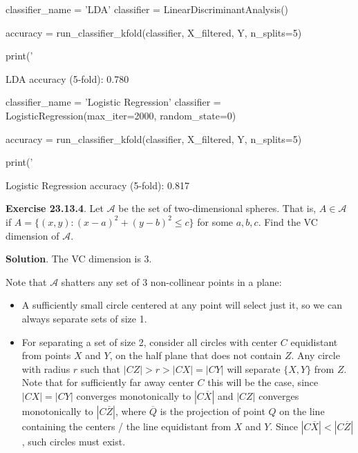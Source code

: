 \begin{python}
classifier_name = 'LDA'
classifier = LinearDiscriminantAnalysis()

accuracy = run_classifier_kfold(classifier, X_filtered, Y, n_splits=5)

print('%
\end{python}

\begin{console}
LDA accuracy (5-fold): 0.780
\end{console}

\begin{python}
classifier_name = 'Logistic Regression'
classifier = LogisticRegression(max_iter=2000, random_state=0)

accuracy = run_classifier_kfold(classifier, X_filtered, Y, n_splits=5)

print('%
\end{python}

\begin{console}
Logistic Regression accuracy (5-fold): 0.817
\end{console}

\textbf{Exercise 23.13.4}. Let \(\mathcal{A}\) be the set of
two-dimensional spheres. That is, \(A \in \mathcal{A}\) if
\(A = \{ (x, y) : (x - a)^2 + (y - b)^2 \leq c \}\) for some
\(a, b, c\). Find the VC dimension of \(\mathcal{A}\).

\textbf{Solution}. The VC dimension is 3.

Note that \(\mathcal{A}\) shatters any set of 3 non-collinear points in
a plane:

\begin{itemize}[tightlist]
\item
  A sufficiently small circle centered at any point will select just it,
  so we can always separate sets of size 1.
\item
  For separating a set of size 2, consider all circles with center \(C\)
  equidistant from points \(X\) and \(Y\), on the half plane that does
  not contain \(Z\). Any circle with radius \(r\) such that
  \(|CZ| > r > |CX| = |CY|\) will separate \(\{ X, Y \}\) from \(Z\).
  Note that for sufficiently far away center \(C\) this will be the
  case, since \(|CX| = |CY|\) converges monotonically to
  \(|C\overline{X}|\) and \(|CZ|\) converges monotonically to
  \(|C\overline{Z}|\), where \(\overline{Q}\) is the projection of point
  \(Q\) on the line containing the centers / the line equidistant from
  \(X\) and \(Y\). Since \(|C\overline{X}| < |C\overline{Z}|\), such
  circles must exist.
\end{itemize}

